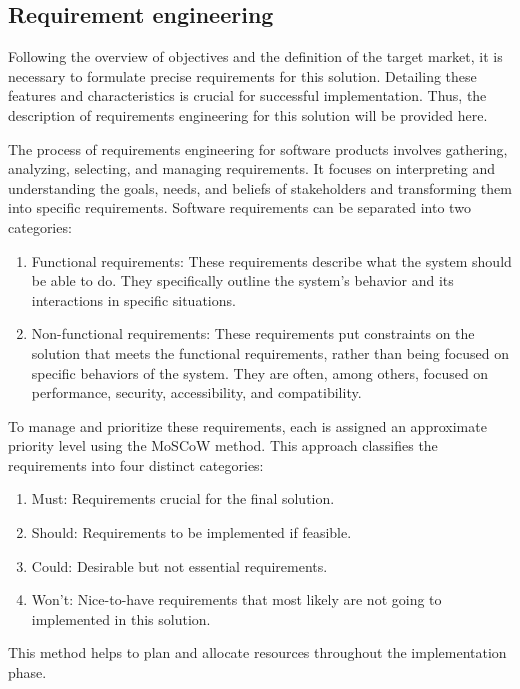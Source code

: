 \subsection{Requirement engineering} \label{requirements}

Following the overview of objectives and the definition of the target market, it is necessary to formulate precise requirements for this solution. Detailing these features and characteristics is crucial for successful implementation. Thus, the description of requirements engineering for this solution will be provided here.

The process of requirements engineering for software products involves gathering, analyzing, selecting, and managing requirements. It focuses on interpreting and understanding the goals, needs, and beliefs of stakeholders and transforming them into specific requirements.
Software requirements can be separated into two categories: \cite{Aurum2005}
\begin{enumerate}
    \item Functional requirements: These requirements describe what the system should be able to do. They specifically outline the system's behavior and its interactions in specific situations.
    \item Non-functional requirements: These requirements put constraints on the solution that meets the functional requirements, rather than being focused on specific behaviors of the system. They are often, among others, focused on performance, security, accessibility, and compatibility.
\end{enumerate}

To manage and prioritize these requirements, each is assigned an approximate priority level using the MoSCoW method. This approach classifies the requirements into four distinct categories: \cite{Kravchenko2022}
\begin{enumerate}
    \item Must: Requirements crucial for the final solution.
    \item Should: Requirements to be implemented if feasible.
    \item Could: Desirable but not essential requirements.
    \item Won't: Nice-to-have requirements that most likely are not going to implemented in this solution.
\end{enumerate}
This method helps to plan and allocate resources throughout the implementation phase.

